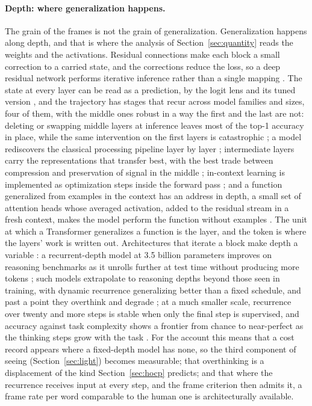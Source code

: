 \paragraph{Depth: where generalization happens.}
\label{sec:depth}
\label{sec:address}
\label{sec:depthtime}
The grain of the frames is not the grain of generalization. Generalization happens along depth, and
that is where the analysis of Section~\ref{sec:quantity} reads the weights and the activations.
Residual connections make each block a small correction to a carried state, and the corrections reduce
the loss, so a deep residual network performs iterative inference rather than a single mapping
\citep{jastrzebski2018}. The state at every layer can be read as a prediction, by the logit lens and
its tuned version \citep{nostalgebraist2020,belrose2023}, and the trajectory has stages that recur
across model families and sizes, four of them, with the middle ones robust in a way the first and the
last are not: deleting or swapping middle layers at inference leaves most of the top-1 accuracy in
place, while the same intervention on the first layers is catastrophic \citep{lad2024}; a model
rediscovers the classical processing pipeline layer by layer \citep{tenney2019}; intermediate layers
carry the representations that transfer best, with the best trade between compression and
preservation of signal in the middle \citep{skean2025}; in-context learning is implemented as
optimization steps inside the forward pass \citep{vonoswald2023}; and a function generalized from
examples in the context has an address in depth, a small set of attention heads whose averaged
activation, added to the residual stream in a fresh context, makes the model perform the function
without examples \citep{todd2024}. The unit at which a Transformer generalizes a function is the
layer, and the token is where the layers' work is written out. Architectures that iterate a block make
depth a variable \citep{dehghani2019,giannou2023}: a recurrent-depth model at 3.5 billion parameters
improves on reasoning benchmarks as it unrolls further at test time without producing more tokens
\citep{geiping2025}; such models extrapolate to reasoning depths beyond those seen in training, with
dynamic recurrence generalizing better than a fixed schedule, and past a point they overthink and
degrade \citep{kohli2026}; at a much smaller scale, recurrence over twenty and more steps is stable
when only the final step is supervised, and accuracy against task complexity shows a frontier from
chance to near-perfect as the thinking steps grow with the task \citep{chen2026}. For the account this
means that a cost record appears where a fixed-depth model has none, so the third component of
seeing (Section~\ref{sec:light}) becomes measurable; that overthinking is a displacement of the kind
Section~\ref{sec:hocp} predicts; and that where the recurrence receives input at every step, and the
frame criterion then admits it, a frame rate per word comparable to the human one is architecturally
available.

